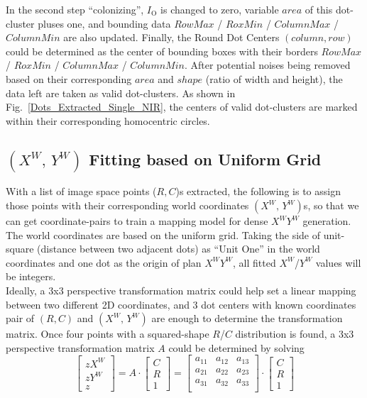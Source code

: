 %
In the second step \enquote{colonizing},  \(I_{\text{O}}\) is changed to zero, variable \(area\) of this dot-cluster pluses one, and bounding data \(RowMax\) / \(RoxMin\) / \(ColumnMax\) / \(ColumnMin\) are also updated.%
%
Finally, the Round Dot Centers \((column, row)\) could be determined as the center of bounding boxes with their borders \(RowMax\) / \(RoxMin\) / \(ColumnMax\) / \(ColumnMin\). After potential noises being removed based on their corresponding \(area\) and \(shape\) (ratio of width and height), the data left are taken as valid dot-clusters. As shown in Fig.~\ref{Dots_Extracted_Single_NIR}, the centers of valid dot-clusters are marked within their corresponding homocentric circles.
\subsection{\((X^W, \,Y^W)\) Fitting based on Uniform Grid}
\label{uniformGridFittingXY}
With a list of image space points (\(R, C\))s extracted, the following is to assign those points with their corresponding world coordinates \((X^W, \,Y^W)\)s, so that we can get coordinate-pairs to train a mapping model for dense \(X^WY^W\) generation. The world coordinates are based on the uniform grid. Taking the side of unit-square (distance between two adjacent dots) as \enquote{Unit One} in the world coordinates and one dot as the origin of plan \(X^WY^W\), all fitted \(X^W\)/\(Y^W\) values will be integers. %
\\\indent%
Ideally, a 3x3 perspective transformation matrix could help set a linear mapping between two different 2D coordinates, and 3 dot centers with known coordinates pair of \((R, C)\) and \((X^W, \,Y^W)\) are enough to determine the transformation matrix. Once four points with a squared-shape \(R\)/\(C\) distribution is found, a 3x3 perspective transformation matrix \(A\) could be determined by solving 
\begin{equation}
%
\left[ \begin{array}{c} %
zX^W \\ zY^W \\ z \end{array} \right] %
= %
A\cdot \left[ \begin{array}{c} %
C \\ R \\ 1 \end{array} \right] %
= %
\begin{bmatrix} 
a_{11} & a_{12} & a_{13} \\
a_{21} & a_{22} & a_{23} \\
a_{31} & a_{32} & a_{33} \\
\end{bmatrix}%
\cdot \left[ \begin{array}{c} %
C \\ R \\ 1 \end{array} \right] %
%
\label{perspectiveDistortionCorrectionEquation}
\end{equation}%
